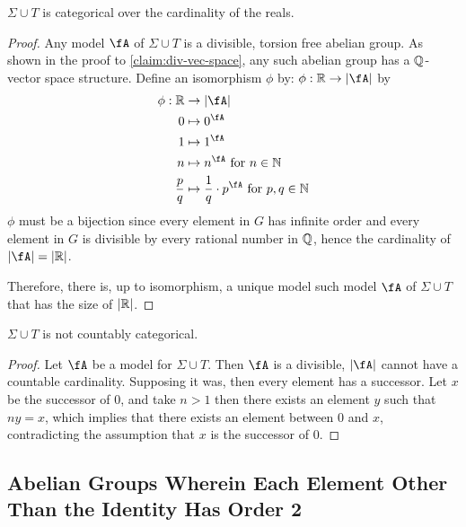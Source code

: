 \begin{claim}
  $\Sigma \cup T$ is categorical over the cardinality of the reals.

  \begin{proof}
    Any model $\fA$ of $\Sigma \cup T$ is a divisible,
    torsion free abelian group.
    As shown in the proof to \ref{claim:div-vec-space},
    any such abelian group has a $\mathbb{Q}$-vector space structure.
    Define an isomorphism $\phi$ by: $\phi : \R \to \abs{\fA}$ by
    \begin{align*}
      \phi : \R &\to \abs{\fA} \\
      0 &\mapsto 0^\fA \\
      1 &\mapsto 1^\fA \\
      n &\mapsto n^\fA \text{ for } n \in \N \\
      \frac{p}{q} &\mapsto \frac{1}{q} \cdot p^\fA \text{ for } p, q \in \N
    \end{align*}
    $\phi$ must be a bijection since every element in $G$ has infinite order
    and every element in $G$ is divisible by every rational number in $\mathbb{Q}$,
    hence the cardinality of $\abs{\fA} = \abs{\R}$.

    Therefore, there is, up to isomorphism, a unique model such model
    $\fA$ of $\Sigma \cup T$ that has the size of $\lvert\mathbb{R}\rvert$.
  \end{proof}
\end{claim}

\begin{claim}
  $\Sigma \cup T$ is not countably categorical.

  \begin{proof}
    Let $\fA$ be a model for $\Sigma \cup T$.
    Then $\fA$ is a divisible, $\abs{\fA}$ cannot have a countable
    cardinality. Supposing it was, then every element has a successor.
    Let $x$ be the successor of $0$, and take $n > 1$ then there exists
    an element $y$ such that $ny = x$, which implies that there exists
    an element between $0$ and $x$, contradicting the
    assumption that $x$ is the successor of $0$.
  \end{proof}
\end{claim}


\bigskip

\subsection{Abelian Groups Wherein Each Element Other Than the Identity
Has Order 2}~\label{sec:axiomatizing-abelian-groups-order-two}

